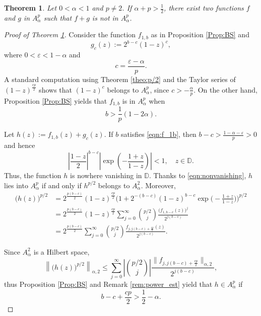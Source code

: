 \documentclass[10pt,a4paper]{amsart}
\newtheorem{theorem}{Theorem}
\newcommand{\D}{\mathbb{{D}}}
\begin{document}
        \begin{theorem}
        \label{theo:NonLinear}
            Let $0<\alpha<1$ and $p \neq 2$. If $\alpha + p > \frac{1}{2}$, there exist two functions $f$ and $g$ in $A^p_\alpha$ such that $f+g$ is not in $A^p_\alpha$.
        \end{theorem}

        \begin{proof}[Proof of Theorem \ref{theo:NonLinear}]
        	Consider the function $f_{1, b}$ as in Proposition \ref{Prop:BS} and 
                \[
                    g_c(z):=2^{b-c}(1-z)^c,
                \]
                where $0<\varepsilon<1-\alpha$ and
                \[
                    c=\frac{\varepsilon-\alpha}{p}.
                \]
                A standard computation using Theorem \ref{theo:p/2} and the Taylor series of $(1-z)^\frac{cp}{2}$ shows that $(1-z)^c$ belongs to $A^p_\alpha$, since $c>-\frac{\alpha}{p}$. On the other hand, Proposition \ref{Prop:BS} yields that $f_{1, b}$ is in $A^p_\alpha$ when 
                \begin{equation}
                \label{eqn:f_1b}
                    b>\frac{1}{p}(1-2\alpha).
                \end{equation}
            
            Let $h(z) := f_{1, b}(z) + g_c(z)$. If $b$ satisfies \eqref{eqn:f_1b}, then $b - c > \frac{1 - \alpha - \varepsilon}{p} > 0$ and hence 
                \[
                    \left| \dfrac{1-z}{2} \right|^{b-c} \left|\exp\left(-\frac{1+z}{1-z}\right)\right| < 1, \quad z \in \mathbb{D}.
                \]
                Thus, the function $h$ is nowhere vanishing in $\D$. Thanks to \eqref{eqn:nonvanishing}, $h$ lies into $A_\alpha^p$ if and only if $h^{p/2}$ belongs to $A^2_\alpha$. Moreover,
            	\[
            		\begin{aligned}
            		\big(h(z)\big)^{p/2} & = 2^{\frac{p(b-c)}{2}} (1-z)^{\frac{cp}{2}}\Bigg(1+ 2^{-(b-c)}(1-z)^{b-c}\exp\bigg(-\frac{1+z}{1-z}\bigg)\Bigg)^{p/2} \\
            		& = 2^{\frac{p(b-c)}{2}} (1-z)^{\frac{cp}{2}} \sum_{j = 0}^\infty \binom{p/2}{j} \frac{\big(f_{1,b-c}(z)\big)^j}{2^{j(b-c)}} \\
            		& = 2^{\frac{p(b-c)}{2}}  \sum_{j = 0}^\infty \binom{p/2}{j} \frac{f_{j,j(b-c) + \frac{cp}{2}}(z)}{2^{j(b-c)}}.
            		\end{aligned}
            	\]
            
            Since $ A^2_\alpha$ is a Hilbert space,
                \[
                    \left\|\big(h(z)\big)^{p/2}\right\|_{\alpha, 2}\le\sum_{j = 0}^\infty \left|\binom{p/2}{j}\right| \frac{\|f_{j,j(b-c) + \frac{cp}{2}}\|_{\alpha, 2}}{2^{j(b-c)}},
                \]
                thus Proposition \ref{Prop:BS} and Remark \ref{rem:power_est} yield that $h \in A^p_\alpha$ if 
                    \begin{equation}
                    \label{eqn:h}
                        b-c+\frac{cp}{2}>\frac{1}{2}-\alpha.
                    \end{equation}
            

\end{proof}
\end{document}
